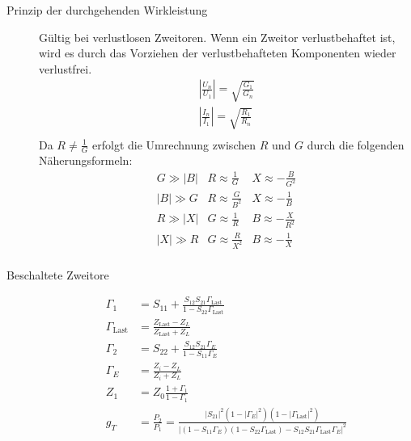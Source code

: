 \begin{description}
\item[Prinzip der durchgehenden Wirkleistung] Gültig bei verlustlosen Zweitoren. Wenn ein Zweitor verlustbehaftet ist, wird es durch das Vorziehen der verlustbehafteten Komponenten wieder verlustfrei.
\begin{align*}
\left\vert \frac{U_n}{U_1} \right\vert = \sqrt{\frac{G_1}{G_n}} \\
\left\vert \frac{I_n}{I_1} \right\vert = \sqrt{\frac{R_1}{R_n}} \\
\end{align*}
Da $R \neq \frac{1}{G}$ erfolgt die Umrechnung zwischen $R$ und $G$ durch die folgenden Näherungsformeln:
\begin{equation*}
\begin{array}{ccc}
G \gg |B| & R \approx \frac{1}{G} & X \approx - \frac{B}{G^2} \\
|B| \gg G & R \approx \frac{G}{B^2} & X \approx - \frac{1}{B} \\
R \gg |X| & G \approx \frac{1}{R} & B \approx - \frac{X}{R^2} \\
|X| \gg R & G \approx \frac{R}{X^2} & B \approx - \frac{1}{X} \\
\end{array}
\end{equation*}
\renewcommand{\arraystretch}{1}

\item[Beschaltete Zweitore] \strut
\begin{center}
\begin{circuitikz}[scale=1, every node/.style={scale=1}]

\end{circuitikz}
\end{center}
\begin{align*}
\Gamma_1 &= S_{11} + \frac{S_{12} S_{21} \Gamma_\text{Last}}{1 - S_{22} \Gamma_\text{Last}} \\
\Gamma_\text{Last} &= \frac{Z_\text{Last} - Z_L}{Z_\text{Last} + Z_L} \\
\Gamma_2 &= S_{22} + \frac{S_{12} S_{21} \Gamma_E}{1 - S_{11} \Gamma_E} \\
\Gamma_E &= \frac{Z_i - Z_L}{Z_i + Z_L} \\
Z_1 &= Z_0 \frac{1+\Gamma_1 }{1-\Gamma_1} \\
g_T &= \frac{P_2}{P_1} = \frac{ |S_{21}|^2 (1-|\Gamma_E|^2) (1-|\Gamma_\text{Last}|^2) }{\left\vert (1-S_{11}\Gamma_E)(1-S_{22}\Gamma_\text{Last}) - S_{12}S_{21} \Gamma_\text{Last}\Gamma_E \right\vert ^2}
\end{align*}
\end{description}